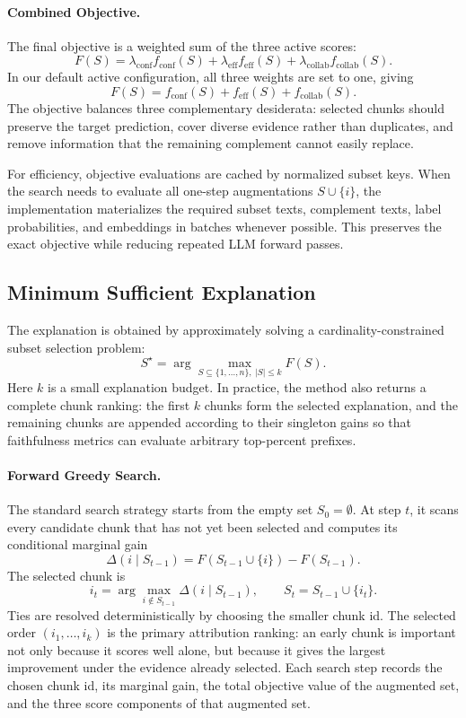 \paragraph{Combined Objective.}
The final objective is a weighted sum of the three active scores:
\[
    F(S)=
    \lambda_{\mathrm{conf}} f_{\mathrm{conf}}(S)
    +\lambda_{\mathrm{eff}} f_{\mathrm{eff}}(S)
    +\lambda_{\mathrm{collab}} f_{\mathrm{collab}}(S).
\]
In our default active configuration, all three weights are set to one, giving
\[
    F(S)=
    f_{\mathrm{conf}}(S)
    +f_{\mathrm{eff}}(S)
    +f_{\mathrm{collab}}(S).
\]
The objective balances three complementary desiderata: selected chunks should
preserve the target prediction, cover diverse evidence rather than duplicates,
and remove information that the remaining complement cannot easily replace.

For efficiency, objective evaluations are cached by normalized subset keys.
When the search needs to evaluate all one-step augmentations
$S\cup\{i\}$, the implementation materializes the required subset texts,
complement texts, label probabilities, and embeddings in batches whenever
possible.  This preserves the exact objective while reducing repeated LLM
forward passes.

\subsection{Minimum Sufficient Explanation}

The explanation is obtained by approximately solving a cardinality-constrained
subset selection problem:
\[
    S^{\star}=\arg\max_{S\subseteq \{1,\ldots,n\},\ |S|\leq k} F(S).
\]
Here $k$ is a small explanation budget.  In practice, the method also returns a
complete chunk ranking: the first $k$ chunks form the selected explanation, and
the remaining chunks are appended according to their singleton gains so that
faithfulness metrics can evaluate arbitrary top-percent prefixes.

\paragraph{Forward Greedy Search.}
The standard search strategy starts from the empty set $S_0=\emptyset$.  At
step $t$, it scans every candidate chunk that has not yet been selected and
computes its conditional marginal gain
\[
    \Delta(i\mid S_{t-1})=
    F(S_{t-1}\cup\{i\})-F(S_{t-1}).
\]
The selected chunk is
\[
    i_t=\arg\max_{i\notin S_{t-1}}\Delta(i\mid S_{t-1}),
    \qquad
    S_t=S_{t-1}\cup\{i_t\}.
\]
Ties are resolved deterministically by choosing the smaller chunk id.  The
selected order $(i_1,\ldots,i_k)$ is the primary attribution ranking: an early
chunk is important not only because it scores well alone, but because it gives
the largest improvement under the evidence already selected.  Each search step
records the chosen chunk id, its marginal gain, the total objective value of the
augmented set, and the three score components of that augmented set.

